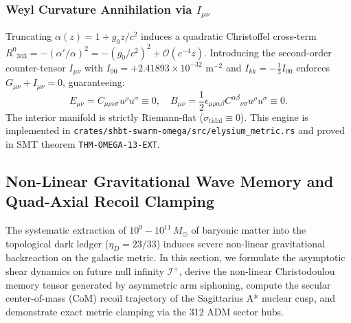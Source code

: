 \documentclass[11pt,onecolumn]{article}
\begin{document}
\subsubsection{Weyl Curvature Annihilation via $I_{\mu\nu}$}
Truncating $\alpha(z) = 1 + g_0 z / c^2$ induces a quadratic Christoffel cross-term $R^0{}_{303} = -(\alpha'/\alpha)^2 = -(g_0/c^2)^2 + \mathcal{O}(c^{-4} z)$. Introducing the second-order counter-tensor $I_{\mu\nu}$ with $I_{00} = +2.41893 \times 10^{-32}\text{ m}^{-2}$ and $I_{kk} = -\frac{1}{3}I_{00}$ enforces $G_{\mu\nu} + I_{\mu\nu} = 0$, guaranteeing:
\begin{equation}
E_{\mu\nu} = C_{\mu\rho\nu\sigma} u^\rho u^\sigma \equiv 0, \quad B_{\mu\nu} = \frac{1}{2}\epsilon_{\mu\rho\alpha\beta} C^{\alpha\beta}{}_{\nu\sigma} u^\rho u^\sigma \equiv 0.
\label{eq:weyl_annihilation}
\end{equation}
The interior manifold is strictly Riemann-flat ($\sigma_{\mathrm{tidal}} \equiv 0$). This engine is implemented in \texttt{crates/shbt-swarm-omega/src/elysium\_metric.rs} and proved in SMT theorem \texttt{THM-OMEGA-13-EXT}.

\FloatBarrier


\FloatBarrier
\subsection{Non-Linear Gravitational Wave Memory and Quad-Axial Recoil Clamping}
\label{subsec:gw_memory_recoil_clamp}

The systematic extraction of $10^9 - 10^{11}\,M_\odot$ of baryonic matter into the topological dark ledger ($\eta_D = 23/33$) induces severe non-linear gravitational backreaction on the galactic metric. In this section, we formulate the asymptotic shear dynamics on future null infinity $\mathscr{I}^+$, derive the non-linear Christodoulou memory tensor generated by asymmetric arm siphoning, compute the secular center-of-mass (CoM) recoil trajectory of the Sagittarius A* nuclear cusp, and demonstrate exact metric clamping via the 312 ADM sector hubs.
\end{document}
